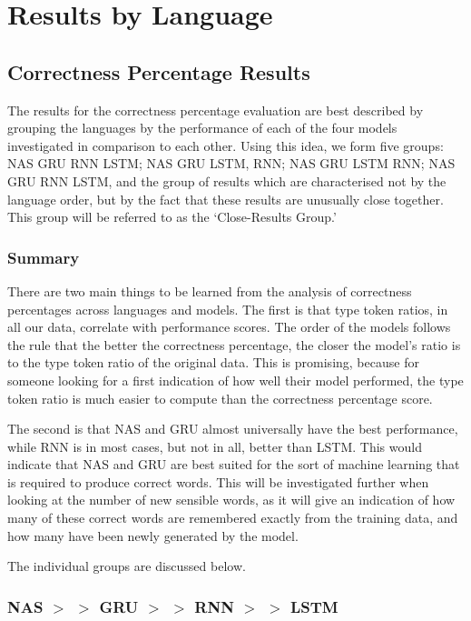 \documentclass[11pt,a4paper,twoside,openright]{scrbook}
\begin{document}
\section{Results by Language}
\label{section:language_differences}

\subsection{Correctness Percentage Results}
The results for the correctness percentage evaluation are best described by grouping the languages by the performance of each of the four models investigated in comparison to each other. Using this idea, we form five groups: NAS GRU RNN LSTM; NAS GRU LSTM, RNN; NAS GRU LSTM RNN; NAS GRU RNN LSTM, and the group of results which are characterised not by the language order, but by the fact that these results are unusually close together. This group will be referred to as the ‘Close-Results Group.'

\subsubsection{Summary}
There are two main things to be learned from the analysis of correctness percentages across languages and models. The first is that type token ratios, in all our data, correlate with performance scores. The order of the models follows the rule that the better the correctness percentage, the closer the model’s ratio is to the type token ratio of the original data. This is promising, because for someone looking for a first indication of how well their model performed, the type token ratio is much easier to compute than the correctness percentage score. 

The second is that NAS and GRU almost universally have the best performance, while RNN is in most cases, but not in all, better than LSTM. This would indicate that NAS and GRU are best suited for the sort of machine learning that is required to produce correct words. This will be investigated further when looking at the number of new sensible words, as it will give an indication of how many of these correct words are remembered exactly from the training data, and how many have been newly generated by the model. 

The individual groups are discussed below.

\subsubsection{NAS $>$ $>$ GRU $>$ $>$ RNN $>$ $>$ LSTM}
\end{document}
